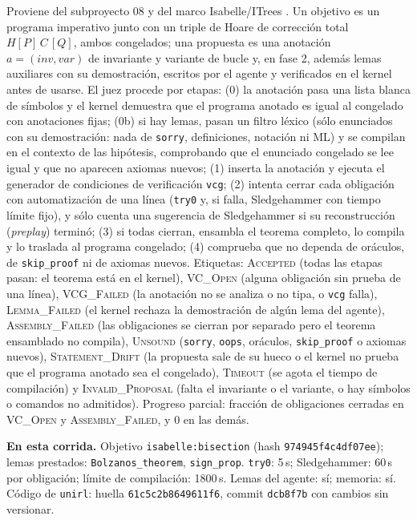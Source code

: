\documentclass[11pt,a4paper]{article}
\begin{document}
Proviene del subproyecto 08 y del marco Isabelle/ITrees \citep{BryantHuertaFoster2026}. Un objetivo es un programa imperativo junto con un triple de Hoare de corrección total $H[P]\,C\,[Q]$, ambos congelados; una propuesta es una anotación $a = (\mathit{inv}, \mathit{var})$ de invariante y variante de bucle y, en fase 2, además lemas auxiliares con su demostración, escritos por el agente y verificados en el kernel antes de usarse. El juez procede por etapas: (0) la anotación pasa una lista blanca de símbolos y el kernel demuestra que el programa anotado es igual al congelado con anotaciones fijas; (0b) si hay lemas, pasan un filtro léxico (sólo enunciados con su demostración: nada de \texttt{sorry}, definiciones, notación ni ML) y se compilan en el contexto de las hipótesis, comprobando que el enunciado congelado se lee igual y que no aparecen axiomas nuevos; (1) inserta la anotación y ejecuta el generador de condiciones de verificación \texttt{vcg}; (2) intenta cerrar cada obligación con automatización de una línea (\texttt{try0} y, si falla, Sledgehammer con tiempo límite fijo), y sólo cuenta una sugerencia de Sledgehammer si su reconstrucción (\emph{preplay}) terminó; (3) si todas cierran, ensambla el teorema completo, lo compila y lo traslada al programa congelado; (4) comprueba que no dependa de oráculos, de \texttt{skip\_proof} ni de axiomas nuevos. Etiquetas: \textsc{Accepted} (todas las etapas pasan: el teorema está en el kernel), \textsc{VC\_Open} (alguna obligación sin prueba de una línea), \textsc{VCG\_Failed} (la anotación no se analiza o no tipa, o \texttt{vcg} falla), \textsc{Lemma\_Failed} (el kernel rechaza la demostración de algún lema del agente), \textsc{Assembly\_Failed} (las obligaciones se cierran por separado pero el teorema ensamblado no compila), \textsc{Unsound} (\texttt{sorry}, \texttt{oops}, oráculos, \texttt{skip\_proof} o axiomas nuevos), \textsc{Statement\_Drift} (la propuesta sale de su hueco o el kernel no prueba que el programa anotado sea el congelado), \textsc{Timeout} (se agota el tiempo de compilación) y \textsc{Invalid\_Proposal} (falta el invariante o el variante, o hay símbolos o comandos no admitidos). Progreso parcial: fracción de obligaciones cerradas en \textsc{VC\_Open} y \textsc{Assembly\_Failed}, y $0$ en las demás.

\textbf{En esta corrida.} Objetivo \texttt{isabelle:\allowbreak{}bisection} (hash \texttt{974945f4c4df07ee}); lemas prestados: \texttt{Bolzanos\_\allowbreak{}theorem}, \texttt{sign\_\allowbreak{}prop}. \texttt{try0}: 5\,s; Sledgehammer: 60\,s por obligación; límite de compilación: 1800\,s. Lemas del agente: sí; memoria: sí. Código de \texttt{unirl}: huella \texttt{61c5c2b8649611f6}, commit \texttt{dcb8f7b} con cambios sin versionar.
\end{document}
